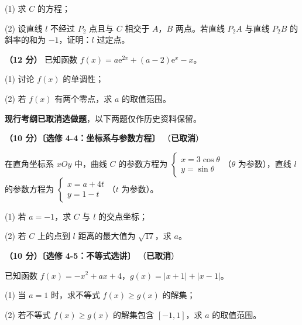   (1) 求 $C$ 的方程；

  (2) 设直线 $l$ 不经过 $P_2$ 点且与 $C$ 相交于 $A$，$B$ 两点。若直线 $P_2A$ 与直线 $P_2B$ 的斜率的和为 $-1$，证明：$l$ 过定点。

\textbf{（12 分）} 已知函数 $f(x)=a\mathrm e^{2x}+(a-2)\mathrm e^{x}-x$。

  (1) 讨论 $f(x)$ 的单调性；

  (2) 若 $f(x)$ 有两个零点，求 $a$ 的取值范围。

\par\medskip


\begin{gktip}
\textbf{ 现行考纲已取消选做题}，以下两题仅作历史资料保留。
\end{gktip}

\textbf{（10 分）〔选修 4-4：坐标系与参数方程〕} （\textbf{已取消}）

在直角坐标系 $xOy$ 中，曲线 $C$ 的参数方程为 $\begin{cases}x=3\cos\theta\\ y=\sin\theta\end{cases}$（$\theta$ 为参数），直线 $l$ 的参数方程为 $\begin{cases}x=a+4t\\ y=1-t\end{cases}$（$t$ 为参数）。

  (1) 若 $a=-1$，求 $C$ 与 $l$ 的交点坐标；

  (2) 若 $C$ 上的点到 $l$ 距离的最大值为 $\sqrt{17}$，求 $a$。

\textbf{（10 分）〔选修 4-5：不等式选讲〕} （\textbf{已取消}）

已知函数 $f(x)=-x^{2}+ax+4$，$g(x)=|x+1|+|x-1|$。

  (1) 当 $a=1$ 时，求不等式 $f(x)\ge g(x)$ 的解集；

  (2) 若不等式 $f(x)\ge g(x)$ 的解集包含 $[-1,1]$，求 $a$ 的取值范围。

\par\medskip

